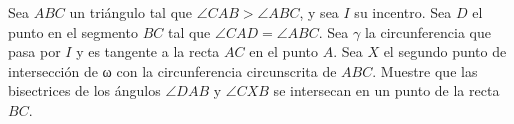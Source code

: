 Sea $ABC$ un triángulo tal que $\angle CAB \gt \angle ABC$, y sea $I$ su incentro. Sea $D$ el punto
en el segmento $BC$ tal que $\angle CAD = \angle ABC$. Sea $\gamma$ la circunferencia que pasa por $I$ y es tangente
a la recta $AC$ en el punto $A$. Sea $X$ el segundo punto de intersección de ω con la circunferencia
circunscrita de $ABC$. Muestre que las bisectrices de los ángulos $\angle DAB$ y $\angle CXB$ se intersecan en un
punto de la recta $BC$.